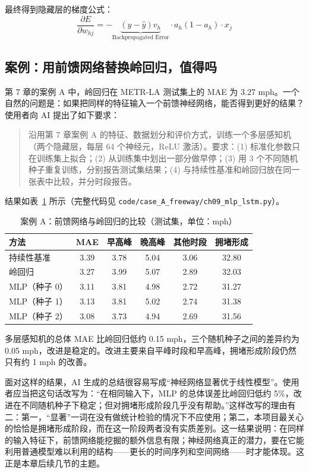 最终得到隐藏层的梯度公式：
\begin{equation}
    \frac{\partial E}{\partial w_{hj}} = - \underbrace{(y - \hat{y}) v_h}_{\text{Backpropagated Error}} \cdot a_h(1-a_h) \cdot x_j
\end{equation}

\subsection{案例：用前馈网络替换岭回归，值得吗}

第 7 章的案例 A 中，岭回归在 METR-LA 测试集上的 MAE 为 3.27 mph。一个自然的问题是：如果把同样的特征输入一个前馈神经网络，能否得到更好的结果？使用者向 AI 提出了如下要求：

\begin{quote}
沿用第 7 章案例 A 的特征、数据划分和评价方式，训练一个多层感知机（两个隐藏层，每层 64 个神经元，ReLU 激活）。要求：(1) 标准化参数只在训练集上拟合；(2) 从训练集中划出一部分做早停；(3) 用 3 个不同随机种子重复训练，分别报告测试集结果；(4) 与持续性基准和岭回归放在同一张表中比较，并分时段报告。
\end{quote}

结果如表~\ref{tab:ch9_mlp} 所示（完整代码见 \texttt{code/case\_A\_freeway/ch09\_mlp\_lstm.py}）。

\begin{table}[H]
\centering
\caption{案例 A：前馈网络与岭回归的比较（测试集，单位：mph）}
\label{tab:ch9_mlp}
\begin{tabular}{lccccc}
\toprule
方法 & MAE & 早高峰 & 晚高峰 & 其他时段 & 拥堵形成 \\
\midrule
持续性基准 & 3.39 & 3.78 & 5.04 & 3.06 & 32.80 \\
岭回归 & 3.27 & 3.99 & 5.07 & 2.89 & 32.03 \\
MLP（种子 0） & 3.11 & 3.81 & 4.98 & 2.72 & 31.27 \\
MLP（种子 1） & 3.13 & 3.81 & 5.02 & 2.74 & 31.38 \\
MLP（种子 2） & 3.08 & 3.73 & 4.94 & 2.69 & 31.56 \\
\bottomrule
\end{tabular}
\end{table}

多层感知机的总体 MAE 比岭回归低约 0.15 mph，三个随机种子之间的差异约为 0.05 mph，改进是稳定的。改进主要来自平峰时段和早高峰，拥堵形成阶段仍然只有约 1 mph 的改善。

面对这样的结果，AI 生成的总结很容易写成“神经网络显著优于线性模型”。使用者应当把这句话改写为：“在相同输入下，MLP 的总体误差比岭回归低约 5\%，改进在不同随机种子下稳定；但对拥堵形成阶段几乎没有帮助。”这样改写的理由有二：第一，“显著”一词在没有做统计检验的情况下不应使用；第二，本项目最关心的恰恰是拥堵形成阶段，而在这一阶段两者没有实质差别。这一结果说明：在同样的输入特征下，前馈网络能挖掘的额外信息有限；神经网络真正的潜力，要在它能利用普通模型难以利用的结构——更长的时间序列和空间网络——时才能体现。这正是本章后续几节的主题。

